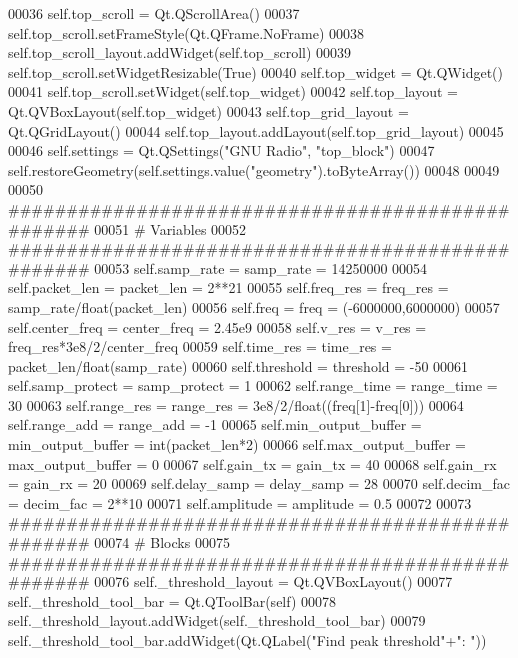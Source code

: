\begin{DoxyCode}
00036         self.top_scroll = Qt.QScrollArea()
00037         self.top\_scroll.setFrameStyle(Qt.QFrame.NoFrame)
00038         self.top\_scroll\_layout.addWidget(self.top_scroll)
00039         self.top\_scroll.setWidgetResizable(\textcolor{keyword}{True})
00040         self.top_widget = Qt.QWidget()
00041         self.top\_scroll.setWidget(self.top_widget)
00042         self.top_layout = Qt.QVBoxLayout(self.top_widget)
00043         self.top_grid_layout = Qt.QGridLayout()
00044         self.top\_layout.addLayout(self.top_grid_layout)
00045 
00046         self.settings = Qt.QSettings(\textcolor{stringliteral}{"GNU Radio"}, \textcolor{stringliteral}{"top\_block"})
00047         self.restoreGeometry(self.settings.value(\textcolor{stringliteral}{"geometry"}).toByteArray())
00048 
00049 
00050         \textcolor{comment}{##################################################}
00051         \textcolor{comment}{# Variables}
00052         \textcolor{comment}{##################################################}
00053         self.samp_rate = samp\_rate = 14250000
00054         self.packet_len = packet\_len = 2**21
00055         self.freq_res = freq\_res = samp\_rate/float(packet\_len)
00056         self.freq = freq = (-6000000,6000000)
00057         self.center_freq = center\_freq = 2.45e9
00058         self.v_res = v\_res = freq\_res*3e8/2/center\_freq
00059         self.time_res = time\_res = packet\_len/float(samp\_rate)
00060         self.threshold = threshold = -50
00061         self.samp_protect = samp\_protect = 1
00062         self.range_time = range\_time = 30
00063         self.range_res = range\_res = 3e8/2/float((freq[1]-freq[0]))
00064         self.range_add = range\_add = -1
00065         self.min_output_buffer = min\_output\_buffer = int(packet\_len*2)
00066         self.max_output_buffer = max\_output\_buffer = 0
00067         self.gain_tx = gain\_tx = 40
00068         self.gain_rx = gain\_rx = 20
00069         self.delay_samp = delay\_samp = 28
00070         self.decim_fac = decim\_fac = 2**10
00071         self.amplitude = amplitude = 0.5
00072 
00073         \textcolor{comment}{##################################################}
00074         \textcolor{comment}{# Blocks}
00075         \textcolor{comment}{##################################################}
00076         self._threshold_layout = Qt.QVBoxLayout()
00077         self._threshold_tool_bar = Qt.QToolBar(self)
00078         self.\_threshold\_layout.addWidget(self._threshold_tool_bar)
00079         self.\_threshold\_tool\_bar.addWidget(Qt.QLabel(\textcolor{stringliteral}{"Find peak threshold"}+\textcolor{stringliteral}{": "}))

\end{DoxyCode}
